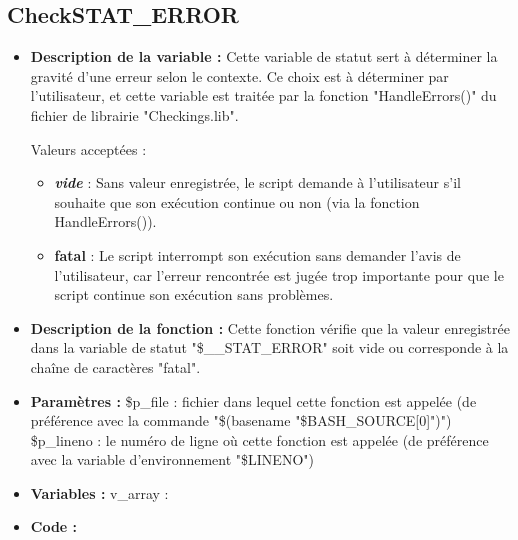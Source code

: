 \documentclass[a4paper,10pt]{article}
\begin{document}
\subsection{CheckSTAT\_ERROR}
\begin{itemize}
    \item \textbf{Description de la variable :} Cette variable de statut sert à déterminer la gravité d'une erreur selon le contexte. Ce choix est à déterminer par l'utilisateur, et cette variable est traitée par la fonction "HandleErrors()" du fichier de librairie "Checkings.lib".
    
    Valeurs acceptées :
    \begin{itemize}
        \item \textbf{\textit{vide}} : Sans valeur enregistrée, le script demande à l'utilisateur s'il souhaite que son exécution continue ou non (via la fonction HandleErrors()).
        \item \textbf{fatal} : Le script interrompt son exécution sans demander l'avis de l'utilisateur, car l'erreur rencontrée est jugée trop importante pour que le script continue son exécution sans problèmes.
    \end{itemize}

    \item \textbf{Description de la fonction :} Cette fonction vérifie que la valeur enregistrée dans la variable de statut "\$\_\_STAT\_ERROR" soit vide ou corresponde à la chaîne de caractères "fatal".

    \item \textbf{Paramètres :} \$p\_file : fichier dans lequel cette fonction est appelée (de préférence avec la commande "\$(basename "\$BASH\_SOURCE[0]")")
    \$p\_lineno : le numéro de ligne où cette fonction est appelée (de préférence avec la variable d'environnement "\$LINENO")

    \item \textbf{Variables :} v\_array :

    \item \textbf{Code :}
\end{itemize}
\end{document}
